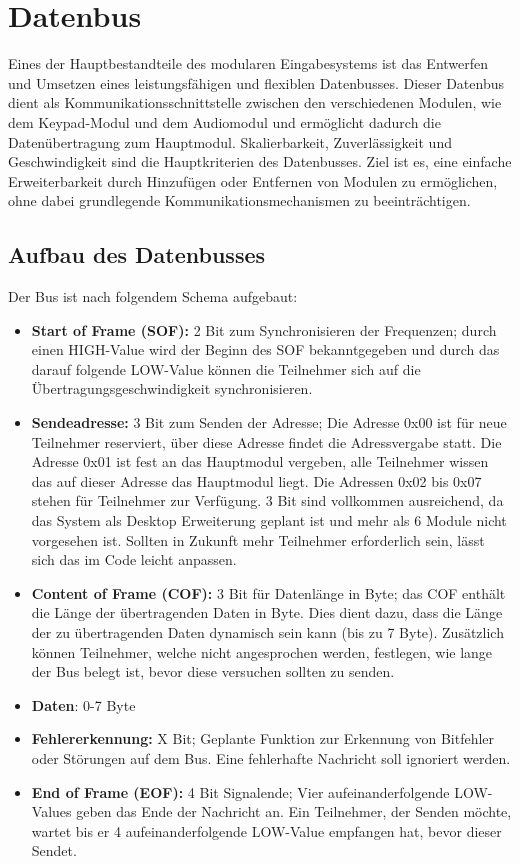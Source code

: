 \section{Datenbus}
Eines der Hauptbestandteile des modularen Eingabesystems ist das Entwerfen und Umsetzen eines leistungsfähigen und flexiblen Datenbusses. Dieser Datenbus dient als Kommunikationsschnittstelle zwischen den verschiedenen Modulen, wie dem Keypad-Modul und dem Audiomodul und ermöglicht dadurch die Datenübertragung zum Hauptmodul. Skalierbarkeit, Zuverlässigkeit und Geschwindigkeit sind die Hauptkriterien des Datenbusses. Ziel ist es, eine einfache Erweiterbarkeit durch Hinzufügen oder Entfernen von Modulen zu ermöglichen, ohne dabei grundlegende Kommunikationsmechanismen zu beeinträchtigen.

\subsection{Aufbau des Datenbusses}
Der Bus ist nach folgendem Schema aufgebaut:
\begin{itemize}
	\item \textbf{Start of Frame (SOF):} 2 Bit zum Synchronisieren der Frequenzen; durch einen HIGH-Value wird der Beginn des SOF bekanntgegeben und durch das darauf folgende LOW-Value können die Teilnehmer sich auf die Übertragungsgeschwindigkeit synchronisieren.
	\item \textbf{Sendeadresse:} 3 Bit zum Senden der Adresse; Die Adresse 0x00 ist für neue Teilnehmer reserviert, über diese Adresse findet die Adressvergabe statt. Die Adresse 0x01 ist fest an das Hauptmodul vergeben, alle Teilnehmer wissen das auf dieser Adresse das Hauptmodul liegt. Die Adressen 0x02 bis 0x07 stehen für Teilnehmer zur Verfügung. 3 Bit sind vollkommen ausreichend, da das System als Desktop Erweiterung geplant ist und mehr als 6 Module nicht vorgesehen ist. Sollten in Zukunft mehr Teilnehmer erforderlich sein, lässt sich das im Code leicht anpassen.
	\item \textbf{Content of Frame (COF):} 3 Bit für Datenlänge in Byte; das COF enthält die Länge der übertragenden Daten in Byte. Dies dient dazu, dass die Länge der zu übertragenden Daten dynamisch sein kann (bis zu 7 Byte). Zusätzlich können Teilnehmer, welche nicht angesprochen werden, festlegen, wie lange der Bus belegt ist, bevor diese versuchen sollten zu senden.
	\item \textbf{Daten}: 0-7 Byte
	\item \textbf{Fehlererkennung:} X Bit; Geplante Funktion zur Erkennung von Bitfehler oder Störungen auf dem Bus. Eine fehlerhafte Nachricht soll ignoriert werden. 
	\item \textbf{End of Frame (EOF):} 4 Bit Signalende; Vier aufeinanderfolgende LOW-Values geben das Ende der Nachricht an. Ein Teilnehmer, der Senden möchte, wartet bis er 4 aufeinanderfolgende LOW-Value empfangen hat, bevor dieser Sendet.
\end{itemize}

